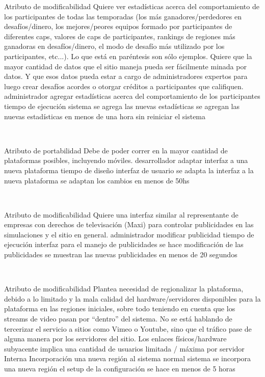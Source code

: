 \escenario
{Atributo de modificabilidad}
{Quiere ver estadísticas acerca del comportamiento de los participantes de todas las
temporadas (los más ganadores/perdedores en desafíos/dinero, los mejores/peores
equipos formado por participantes de diferentes caps, valores de caps de participantes,
rankings de regiones más ganadoras en desafíos/dinero, el modo de desafío más utilizado
por los participantes, etc...). Lo que está en paréntesis son sólo ejemplos. Quiere que la
mayor cantidad de datos que el sitio maneja pueda ser fácilmente minada por datos. Y
que esos datos pueda estar a cargo de administradores expertos para luego crear
desafíos acordes o otorgar créditos a participantes que califiquen.}
{administrador}
{agregar estadísticas acerca del comportamiento de los participantes}
{tiempo de ejecución}
{sistema}
{se agrega las nuevas estadísticas}
{se agregan las nuevas estadísticas en menos de una hora sin reiniciar el sistema}

~

\escenario
{Atributo de portabilidad}
{Debe de poder correr en la mayor cantidad de plataformas posibles, incluyendo móviles.}	
{desarrollador}
{adaptar interfaz a una nueva plataforma}
{tiempo de diseño}
{interfaz de usuario}
{se adapta la interfaz a la nueva plataforma}
{se adaptan los cambios en menos de 50hs}

~

\escenario
{Atributo de modificabilidad}
{Quiere una interfaz similar al representante de empresas con derechos de televisación (Maxi) para controlar publicidades en las simulaciones y el sitio en general.}
{administrador}
{modificar publicidad}
{tiempo de ejecución}
{interfaz para el manejo de publicidades}
{se hace modificación de las publicidades}
{se muestran las nuevas publicidades en menos de 20 segundos}

~

\escenario
{Atributo de modificabilidad}
{Plantea necesidad de regionalizar la plataforma, debido a lo limitado y la mala calidad del
hardware/servidores disponibles para la plataforma en las regiones iniciales, sobre todo
teniendo en cuenta que los streams de video pasan por “dentro” del sistema. No se está
hablando de tercerizar el servicio a sitios como Vimeo o Youtube, sino que el tráfico pase
de alguna manera por los servidores del sitio. Los enlaces físicos/hardware subyacente
implica una cantidad de usuarios limitada / máxima por servidor}
{Interna}
{Incorporación una nueva región al sistema}
{normal}
{sistema}
{se incorpora una nueva región}
{el setup de la configuración se hace en menos de 5 horas}

